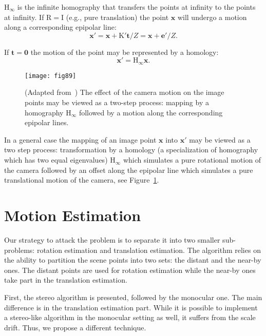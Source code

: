 $\mathrm{H_\infty}$ is the infinite homography that transfers the
points at infinity to the points at infinity.  If $\mathrm{R = I}$
(e.g., pure translation) the point $\mathbf{x}$ will undergo a motion
along a corresponding epipolar line:
\begin{equation}
\mathbf{x}' = \mathbf{x}+ \mathrm{K'}\mathbf{t}/Z = \mathbf{x}+\mathbf{e}'/Z.
\end{equation}

If $\mathbf{t} = \mathbf{0}$ the motion of the point may be represented by a homology:
\begin{equation}
\mathbf{x}' = \mathrm{H_\infty}\mathbf{x}.
\end{equation}

\begin{figure}[h]
  \centering
  \texttt{[image: fig89]}
  \caption{(Adapted from~\cite{Hartley2004}) The effect of the camera motion on
    the image points may be viewed as a two-step process: mapping by a
    homography $\mathrm{H_\infty}$ followed by a motion along the corresponding
    epipolar lines.}
  \label{fig:two_step_motion}
\end{figure}

In a general case the mapping of an image point $\mathbf{x}$ into
$\mathbf{x}'$ may be viewed as a two step process: transformation by a
homology (a specialization of homography which has two equal
eigenvalues) $\mathrm{H_\infty}$ which simulates a pure rotational
motion of the camera followed by an offset along the epipolar line
which simulates a pure translational motion of the camera, see Figure~\ref{fig:two_step_motion}.

\section{Motion Estimation}\label{sec:moest}

Our strategy to attack the problem is to separate it into two smaller
sub-problems: rotation estimation and translation estimation. The
algorithm relies on the ability to partition the scene points into two
sets: the distant and the near-by ones.  The distant points are used
for rotation estimation while the near-by ones take part in the
translation estimation.

First, the stereo algorithm is presented, followed by the monocular
one.  The main difference is in the translation estimation part. While
it is possible to implement a stereo-like algorithm in the monocular
setting as well, it suffers from the scale drift.  Thus, we propose a
different technique.



